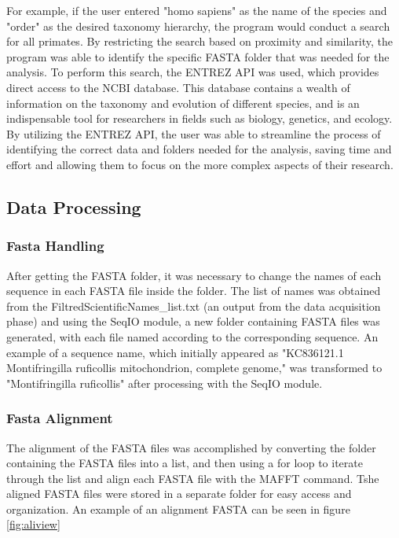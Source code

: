 \documentclass[12pt]{article}
\begin{document}
For example, if the user entered "homo sapiens" as the name of the species and "order" as the desired taxonomy hierarchy, the program would conduct a search for all primates. By restricting the search based on proximity and similarity, the program was able to identify the specific FASTA folder that was needed for the analysis.\newline
To perform this search, the ENTREZ API was used, which provides direct access to the NCBI database. This database contains a wealth of information on the taxonomy and evolution of different species, and is an indispensable tool for researchers in fields such as biology, genetics, and ecology. By utilizing the ENTREZ API, the user was able to streamline the process of identifying the correct data and folders needed for the analysis, saving time and effort and allowing them to focus on the more complex aspects of their research.
\subsection{Data Processing}
\subsubsection{Fasta Handling}
After getting the FASTA folder, it was necessary to change the names of each sequence in each FASTA file inside the folder. The list of names was obtained from the FiltredScientificNames\_list.txt (an output from the data acquisition phase) and using the SeqIO module, a new folder containing FASTA files was generated, with each file named according to the corresponding sequence. An example of a sequence name, which initially appeared as "\>KC836121.1 Montifringilla ruficollis mitochondrion, complete genome," was transformed to "Montifringilla ruficollis" after processing with the SeqIO module.
\subsubsection{Fasta Alignment}
The alignment of the FASTA files was accomplished by converting the folder containing the FASTA files into a list, and then using a for loop to iterate through the list and align each FASTA file with the MAFFT command. Tshe aligned FASTA files were stored in a separate folder for easy access and organization. An example of an alignment FASTA can be seen in figure \ref{fig:aliview}
\end{document}
